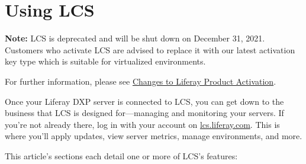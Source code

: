 \section{Using LCS}\label{using-lcs}

\noindent\hrulefill

\textbf{Note:} LCS is deprecated and will be shut down on December 31,
2021. Customers who activate LCS are advised to replace it with our
latest activation key type which is suitable for virtualized
environments.

For further information, please see
\href{https://help.liferay.com/hc/en-us/articles/4402347960845-Changes-to-Liferay-Product-Activation}{Changes
to Liferay Product Activation}.

\noindent\hrulefill

Once your Liferay DXP server is connected to LCS, you can get down to
the business that LCS is designed for---managing and monitoring your
servers. If you're not already there, log in with your account on
\href{https://lcs.liferay.com}{lcs.liferay.com}. This is where you'll
apply updates, view server metrics, manage environments, and more.

This article's sections each detail one or more of LCS's features:

